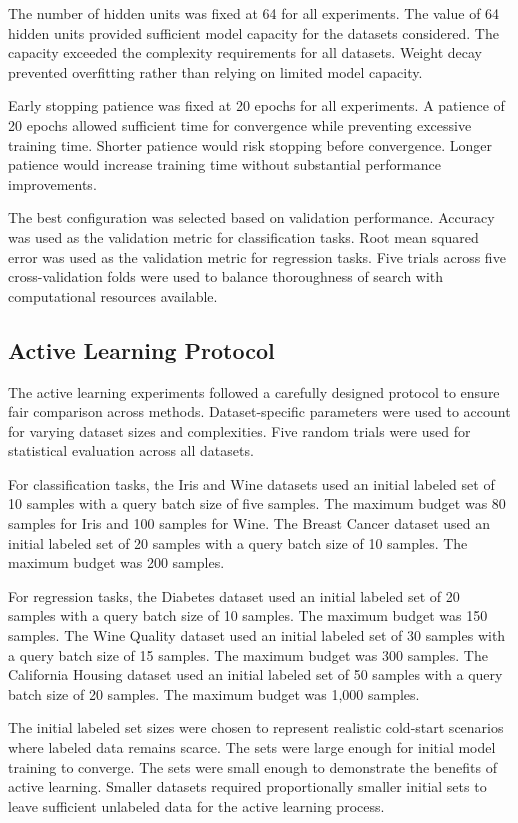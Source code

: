 \documentclass[conference]{IEEEtran}
\begin{document}
The number of hidden units was fixed at 64 for all experiments. The value of 64 hidden units provided sufficient model capacity for the datasets considered. The capacity exceeded the complexity requirements for all datasets. Weight decay prevented overfitting rather than relying on limited model capacity.

Early stopping patience was fixed at 20 epochs for all experiments. A patience of 20 epochs allowed sufficient time for convergence while preventing excessive training time. Shorter patience would risk stopping before convergence. Longer patience would increase training time without substantial performance improvements.

The best configuration was selected based on validation performance. Accuracy was used as the validation metric for classification tasks. Root mean squared error was used as the validation metric for regression tasks. Five trials across five cross-validation folds were used to balance thoroughness of search with computational resources available.

\subsection{Active Learning Protocol}

The active learning experiments followed a carefully designed protocol to ensure fair comparison across methods. Dataset-specific parameters were used to account for varying dataset sizes and complexities. Five random trials were used for statistical evaluation across all datasets.

For classification tasks, the Iris and Wine datasets used an initial labeled set of 10 samples with a query batch size of five samples. The maximum budget was 80 samples for Iris and 100 samples for Wine. The Breast Cancer dataset used an initial labeled set of 20 samples with a query batch size of 10 samples. The maximum budget was 200 samples.

For regression tasks, the Diabetes dataset used an initial labeled set of 20 samples with a query batch size of 10 samples. The maximum budget was 150 samples. The Wine Quality dataset used an initial labeled set of 30 samples with a query batch size of 15 samples. The maximum budget was 300 samples. The California Housing dataset used an initial labeled set of 50 samples with a query batch size of 20 samples. The maximum budget was 1,000 samples.

The initial labeled set sizes were chosen to represent realistic cold-start scenarios where labeled data remains scarce. The sets were large enough for initial model training to converge. The sets were small enough to demonstrate the benefits of active learning. Smaller datasets required proportionally smaller initial sets to leave sufficient unlabeled data for the active learning process.
\end{document}
